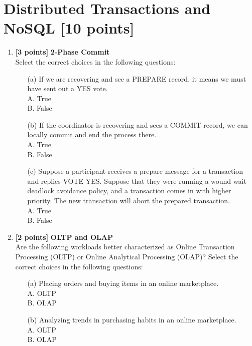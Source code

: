 \documentclass[10pt]{article}
\begin{document}
\newpage
\section{Distributed Transactions and NoSQL \textbf{[10 points]}}

\begin{enumerate}
	\item \textbf{[3 points]} \textbf{2-Phase Commit} \\
	      Select the correct choices in the following questions:
	      \begin{itemize}
		      \item[(a)] If we are recovering and see a PREPARE record, it means we must have sent out a YES vote. \\
		            A. True \\
		            B. False \\
		      \item[(b)] If the coordinator is recovering and sees a COMMIT record, we can locally commit and end the process there. \\
		            A. True \\
		            B. False \\
		      \item[(c)] Suppose a participant receives a prepare message for a transaction and replies VOTE-YES.
		            Suppose that they were running a wound-wait deadlock avoidance policy, and a transaction
		            comes in with higher priority. The new transaction will abort the prepared transaction. \\
		            A. True \\
		            B. False \\
	      \end{itemize}

	\item \textbf{[2 points]} \textbf{OLTP and OLAP} \\
	      Are the following workloads better characterized as Online Transaction Processing (OLTP)
	      or Online Analytical Processing (OLAP)? Select the correct choices in the following questions:
	      \begin{itemize}
		      \item[(a)] Placing orders and buying items in an online marketplace. \\
		            A. OLTP \\
		            B. OLAP \\
		      \item[(b)] Analyzing trends in purchasing habits in an online marketplace. \\
		            A. OLTP \\
		            B. OLAP \\
	      \end{itemize}



\end{enumerate}
\end{document}
